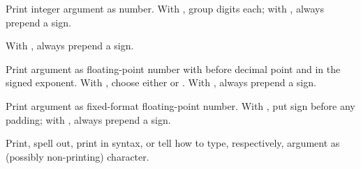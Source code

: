 \begin{LIST}{1cm}
\begin{LIST}{.5cm}
    {%
      Print integer argument as number. With \kwd{:}, group digits 
       each; with , always prepend a sign.
    }

    {%
       With
      , always pre\-pend a sign. 
    }

    {%
      Print argument as floating-point number with 
      before decimal point and  in the signed
      exponent. With , choose either  or
      . With , always prepend a sign. 
    }

    {%
      Print argument as fixed-format floating-point number. With \KWD{:},
      put sign before any padding; with , always prepend a
      sign.
    }
    
    {%
      Print, spell out, print in \kwd{\#$\backslash$} syntax, or tell
      how to type, respectively, argument as (possibly non-printing)
      character. 
    }


\end{LIST}
\end{LIST}
